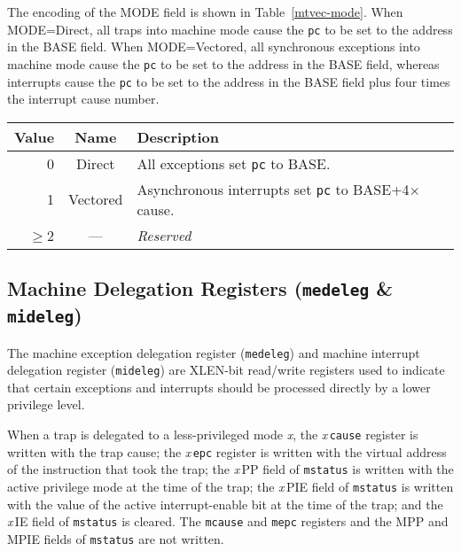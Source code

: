 \fi

The encoding of the MODE field is shown in Table~\ref{mtvec-mode}.  When
MODE=Direct, all traps into machine mode cause the \texttt{pc} to be set to the
address in the BASE field.  When MODE=Vectored, all synchronous exceptions
into machine mode cause the \texttt{pc} to be set to the address in the BASE
field, whereas interrupts cause the \texttt{pc} to be set to the address in
the BASE field plus four times the interrupt cause number.

\begin{table*}[ht!]
\begin{center}
\begin{tabular}{|r|c|l|}
\hline
Value & Name & Description \\
\hline
0      & Direct   & All exceptions set \texttt{pc} to BASE. \\
1      & Vectored & Asynchronous interrupts set \texttt{pc} to BASE+4$\times$cause. \\
$\ge$2 & --- & \emph{Reserved} \\
\hline
\end{tabular}
\end{center}
\caption{Encoding of \texttt{mtvec} MODE field.}
\label{mtvec-mode}
\end{table*}

\subsection{Machine Delegation Registers
(\texttt{medeleg} \& \texttt{mideleg})} \label{machine-exception-interrupt-delegation-registers-medeleg-mideleg}

The machine exception delegation register (\texttt{medeleg}) and machine interrupt delegation register (\texttt{mideleg}) are XLEN-bit read/write registers used to indicate that certain exceptions and interrupts should be processed directly by a lower privilege level.

When a trap is delegated to a less-privileged mode \emph{x}, the
\emph{x}\,\texttt{cause} register is written with the trap cause; the
\emph{x}\,\texttt{epc} register is written with the virtual address of
the instruction that took the trap; the \emph{x}\,PP field
of \texttt{mstatus} is written with the active privilege mode at the time of
the trap; the \emph{x}\,PIE field of \texttt{mstatus} is written with the
value of the active interrupt-enable bit at the time of the trap; and
the \emph{x}\,IE field of \texttt{mstatus} is cleared.  The \texttt{mcause} and
\texttt{mepc} registers and the MPP and MPIE fields of \texttt{mstatus} are
not written.

